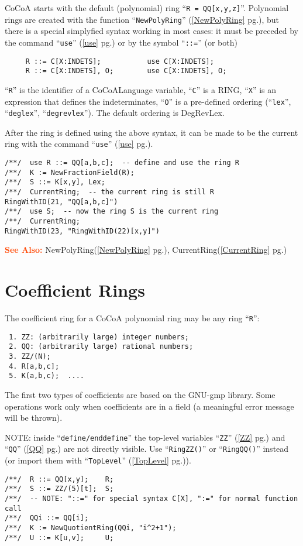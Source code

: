 \documentclass[a4paper]{mybook}
\newcommand\SeeAlso{\par\textcolor{OrangeRed}{\textbf{\large See Also: }}}
\begin{document}
        
CoCoA starts with the default (polynomial) ring ``\verb&R = QQ[x,y,z]&''.
Polynomial rings are created with the function ``\verb&NewPolyRing&'' (\ref{NewPolyRing} pg.\pageref{NewPolyRing}),
but there is a special simplyfied syntax working in most cases:
it must be preceded by the command ``\verb&use&'' (\ref{use} pg.\pageref{use}) or by the symbol ``\verb&::=&''
(or both)
\begin{verbatim}
     R ::= C[X:INDETS];           use C[X:INDETS];
     R ::= C[X:INDETS], O;        use C[X:INDETS], O;
\end{verbatim}
``\verb&R&'' is the identifier of a CoCoALanguage variable,
``\verb&C&'' is a RING,
``\verb&X&'' is an expression that defines the indeterminates,
``\verb&O&'' is a pre-defined ordering (``\verb&lex&'', ``\verb&deglex&'',
``\verb&degrevlex&'').  The default ordering is DegRevLex.
\par 
After the ring is defined using the above syntax, it can be made to be
the current ring with the command ``\verb&use&'' (\ref{use} pg.\pageref{use}).
\begin{Verbatim}[label=example, rulecolor=\color{PineGreen}, frame=single]
/**/  use R ::= QQ[a,b,c];  -- define and use the ring R
/**/  K := NewFractionField(R);
/**/  S ::= K[x,y], Lex;
/**/  CurrentRing;  -- the current ring is still R
RingWithID(21, "QQ[a,b,c]")
/**/  use S;  -- now the ring S is the current ring
/**/  CurrentRing;
RingWithID(23, "RingWithID(22)[x,y]")
\end{Verbatim}


\SeeAlso %
  NewPolyRing(\ref{NewPolyRing} pg.\pageref{NewPolyRing}), 
    CurrentRing(\ref{CurrentRing} pg.\pageref{CurrentRing})

\section{Coefficient Rings}
\label{Coefficient Rings}

        
The coefficient ring for a CoCoA polynomial ring may be any ring ``\verb&R&'':
\begin{verbatim}
 1. ZZ: (arbitrarily large) integer numbers;
 2. QQ: (arbitrarily large) rational numbers;
 3. ZZ/(N);
 4. R[a,b,c];
 5. K(a,b,c);  ....
\end{verbatim}
The first two types of coefficients are based on the GNU-gmp library.
Some operations work only when coefficients are in a field
(a meaningful error message will be thrown).
\par 
NOTE: inside ``\verb&define/enddefine&'' the top-level variables 
``\verb&ZZ&'' (\ref{ZZ} pg.\pageref{ZZ}) and ``\verb&QQ&'' (\ref{QQ} pg.\pageref{QQ}) are not directly visible.
Use ``\verb&RingZZ()&'' or ``\verb&RingQQ()&'' instead (or import them
with ``\verb&TopLevel&'' (\ref{TopLevel} pg.\pageref{TopLevel})).
\begin{Verbatim}[label=example, rulecolor=\color{PineGreen}, frame=single]
/**/  R ::= QQ[x,y];    R;
/**/  S ::= ZZ/(5)[t];  S;
/**/  -- NOTE: "::=" for special syntax C[X], ":=" for normal function call
/**/  QQi ::= QQ[i];
/**/  K := NewQuotientRing(QQi, "i^2+1");
/**/  U ::= K[u,v];     U;
\end{Verbatim}
\end{document}
